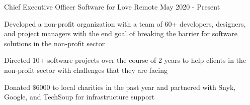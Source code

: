 
\begin{cventries}

   \cventry
    {Chief Executive Officer} %
    {Software for Love} %
    {Remote} %
    {May 2020 - Present} %
    {
      \begin{cvitems} %
\item Developed a non-profit organization with a team of 60+ developers, designers, and project managers with the end goal of breaking the barrier for software solutions in the non-profit sector
\item Directed 10+ software projects over the course of 2 years to help clients in the non-profit sector with challenges that they are facing
\item Donated \$6000 to local charities in the past year and partnered with Snyk, Google, and TechSoup for infrastructure support
\end{cvitems}
    }
\end{cventries}


